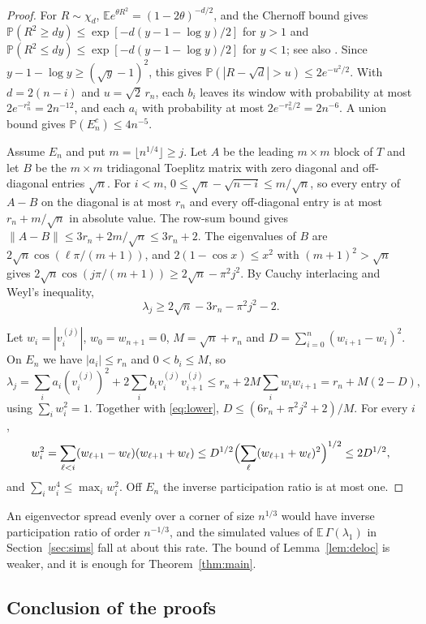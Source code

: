 \documentclass[11pt]{amsart}
\theoremstyle{remark}
\newcommand{\PP}{\mathbb{P}}
\newcommand{\EE}{\mathbb{E}}
\begin{document}
\begin{proof}
For $R\sim\chi_d$, $\EE e^{\theta R^2}=(1-2\theta)^{-d/2}$, and the Chernoff bound gives
$\PP(R^2\ge dy)\le\exp[-d(y-1-\log y)/2]$ for $y>1$ and $\PP(R^2\le dy)\le\exp[-d(y-1-\log y)/2]$ for $y<1$; see also
\cite[Lemma~1]{LM00}. Since $y-1-\log y\ge(\sqrt y-1)^2$, this gives $\PP(|R-\sqrt d|>u)\le2e^{-u^2/2}$. With
$d=2(n-i)$ and $u=\sqrt2\,r_n$, each $b_i$ leaves its window with probability at most $2e^{-r_n^2}=2n^{-12}$, and each
$a_i$ with probability at most $2e^{-r_n^2/2}=2n^{-6}$. A union bound gives $\PP(E_n^c)\le4n^{-5}$.

Assume $E_n$ and put $m=\lfloor n^{1/4}\rfloor\ge j$. Let $A$ be the leading $m\times m$ block of $T$ and let $B$ be the
$m\times m$ tridiagonal Toeplitz matrix with zero diagonal and off-diagonal entries $\sqrt n$. For $i<m$,
$0\le\sqrt n-\sqrt{n-i}\le m/\sqrt n$, so every entry of $A-B$ on the diagonal is at most $r_n$ and every off-diagonal
entry is at most $r_n+m/\sqrt n$ in absolute value. The row-sum bound gives $\|A-B\|\le3r_n+2m/\sqrt n\le3r_n+2$. The
eigenvalues of $B$ are $2\sqrt n\cos(\ell\pi/(m+1))$, and $2(1-\cos x)\le x^2$ with $(m+1)^2>\sqrt n$ gives
$2\sqrt n\cos(j\pi/(m+1))\ge2\sqrt n-\pi^2j^2$. By Cauchy interlacing and Weyl's inequality,
\begin{equation}\label{eq:lower}
\lambda_j\ge2\sqrt n-3r_n-\pi^2j^2-2 .
\end{equation}

Let $w_i=|v^{(j)}_i|$, $w_0=w_{n+1}=0$, $M=\sqrt n+r_n$ and $D=\sum_{i=0}^n(w_{i+1}-w_i)^2$. On $E_n$ we have
$|a_i|\le r_n$ and $0<b_i\le M$, so
\[
\lambda_j=\sum_ia_i(v^{(j)}_i)^2+2\sum_ib_iv^{(j)}_iv^{(j)}_{i+1}\le r_n+2M\sum_iw_iw_{i+1}=r_n+M(2-D),
\]
using $\sum_iw_i^2=1$. Together with \eqref{eq:lower}, $D\le(6r_n+\pi^2j^2+2)/M$. For every $i$,
\[
w_i^2=\sum_{\ell<i}(w_{\ell+1}-w_\ell)(w_{\ell+1}+w_\ell)\le D^{1/2}\Bigl(\sum_\ell(w_{\ell+1}+w_\ell)^2\Bigr)^{1/2}\le2D^{1/2},
\]
and $\sum_iw_i^4\le\max_iw_i^2$. Off $E_n$ the inverse participation ratio is at most one.
\end{proof}

An eigenvector spread evenly over a corner of size $n^{1/3}$ would have inverse participation ratio of order $n^{-1/3}$,
and the simulated values of $\EE\,\Gamma(\lambda_1)$ in Section~\ref{sec:sims} fall at about this rate. The bound of
Lemma~\ref{lem:deloc} is weaker, and it is enough for Theorem~\ref{thm:main}.

\subsection{Conclusion of the proofs}
\end{document}
